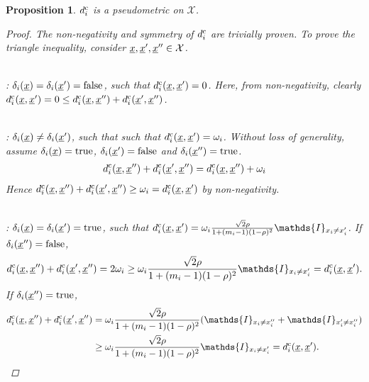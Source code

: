 \documentclass[letterpaper]{article}
\newcommand{\vect}[1]{\underline{\smash{#1}}}
\renewcommand{\v}[1]{\vect{#1}}
\newcommand{\sX}{\mathcal{X}}
\newcommand{\cat}{^{\text{\textnormal{c}}}}
\newtheorem{prop}[thm]{Proposition}
\newcommand{\indicator}{\ensuremath\mathds{I}}
\begin{document}
\begin{prop}
 $d\cat_i$ is a pseudometric on $\sX$.\label{prop:dbr_pseudometric_cat}
\begin{proof}
The non-negativity and symmetry of $d\cat_i$ are trivially proven. To prove the triangle inequality, consider $\v{x}, \v{x}', \v{x}'' \in \sX$. 

~\\: $\delta_i(\v{x}) = \delta_i(\v{x}') = \textrm{false}$, such that $d\cat_i(\v{x},\v{x}') = 0$. Here, from non-negativity, clearly $d\cat_i(\v{x},\v{x}') = 0 \leq d\cat_i(\v{x},\v{x}'') + d\cat_i(\v{x}',\v{x}'')$.

~\\: $\delta_i(\v{x}) \neq \delta_i(\v{x}')$, such that such that  $d\cat_i(\v{x},\v{x}') = \omega_i$.  Without loss of generality, assume $\delta_i(\v{x}) = \text{true}$, $\delta_i(\v{x}') = \text{false}$ and $\delta_i(\v{x}'') = \text{true}$. 
\begin{align}
d\cat_i(\v{x},\v{x}'') + d\cat_i(\v{x}',\v{x}'') = d\cat_i(\v{x},\v{x}'')  + \omega_i
\end{align}
Hence $d\cat_i(\v{x},\v{x}'') + d\cat_i(\v{x}',\v{x}'') \geq \omega_i = d\cat_i(\v{x},\v{x}')$ by non-negativity.

~\\: $\delta_i(\v{x}) = \delta_i(\v{x}')=\textrm{true}$, such that  $d\cat_i(\v{x},\v{x}') =
\omega_i \frac{\sqrt{2} \rho}
{1+(m_i-1)(1-\rho)^2}
 \indicator_{x_i \neq x_i'} $.  
If  $\delta_i(\v{x}'') = \text{false}$,
\begin{align}
d\cat_i(\v{x},\v{x}'') + d\cat_i(\v{x}',\v{x}'') = 
2 \omega_i 
\geq 
\omega_i \frac{\sqrt{2} \rho}
{1+(m_i-1)(1-\rho)^2}
 \indicator_{x_i \neq x_i'}  
= d\cat_i(\v{x},\v{x}').
\end{align} 
If  $\delta_i(\v{x}'') = \text{true}$, 
\begin{align}
d\cat_i(\v{x},\v{x}'') + d\cat_i(\v{x}',\v{x}'')
& = \omega_i \frac{\sqrt{2} \rho}
{1+(m_i-1)(1-\rho)^2}
(
 \indicator_{x_i \neq x_i''} 
+
 \indicator_{x_i' \neq x_i''} 
)
\nonumber\\
& \geq 
\omega_i \frac{\sqrt{2} \rho}
{1+(m_i-1)(1-\rho)^2}
 \indicator_{x_i \neq x_i'} = d\cat_i(\v{x},\v{x}').
\end{align}
\end{proof}
\end{prop}

%
\end{document}
